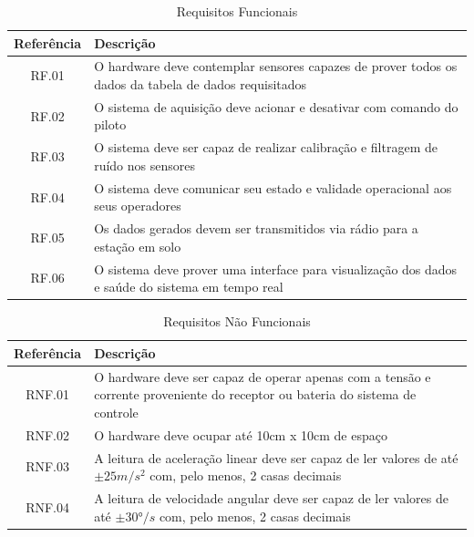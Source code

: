 \begin{table}[ht]
  \centering
  \caption{Requisitos Funcionais}
  \label{tab:requisitos-funcionais}
  \begin{tabular}{c|p{12cm}}
    \textbf{Referência} & \textbf{Descrição} \\
    \hline
    RF.01 & O hardware deve contemplar sensores capazes de prover todos os dados da tabela de dados requisitados \\ \hline
    RF.02 & O sistema de aquisição deve acionar e desativar com comando do piloto \\ \hline
    RF.03 & O sistema deve ser capaz de realizar calibração e filtragem de ruído nos sensores \\ \hline
    RF.04 & O sistema deve comunicar seu estado e validade operacional aos seus operadores \\ \hline
    RF.05 & Os dados gerados devem ser transmitidos via rádio para a estação em solo \\ \hline
    RF.06 & O sistema deve prover uma interface para visualização dos dados e saúde do sistema em tempo real \\ \hline
  \end{tabular}
\end{table}


\begin{table}[ht]
  \centering
  \caption{Requisitos Não Funcionais}
  \label{tab:requisitos-nao-funcionais}
  \begin{tabular}{c|p{12cm}}
    \textbf{Referência} & \textbf{Descrição}\\
    \hline
    RNF.01 & O hardware deve ser capaz de operar apenas com a tensão e corrente proveniente do receptor ou bateria do sistema de controle \\ \hline
    RNF.02 & O hardware deve ocupar até 10cm x 10cm de espaço \\ \hline
    RNF.03 & A leitura de aceleração linear deve ser capaz de ler valores de até $\pm25 m/s^2$ com, pelo menos, 2 casas decimais \\ \hline
    RNF.04 & A leitura de velocidade angular deve ser capaz de ler valores de até $\pm30 °/s$ com, pelo menos, 2 casas decimais \\ \hline
  \end{tabular}
\end{table}
